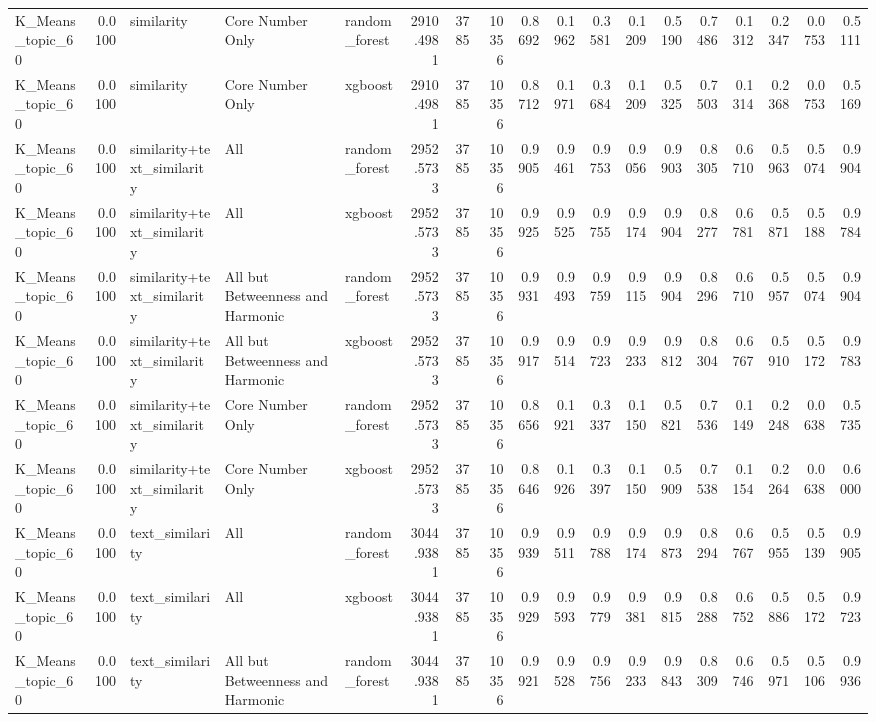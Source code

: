 \begin{tabular}{lrlllrrrrrrrrrrrrr}
K_Means_topic_60 & 0.0100 & similarity & Core Number Only & random_forest & 2910.4981 & 3785 & 10356 & 0.8692 & 0.1962 & 0.3581 & 0.1209 & 0.5190 & 0.7486 & 0.1312 & 0.2347 & 0.0753 & 0.5111 \\
K_Means_topic_60 & 0.0100 & similarity & Core Number Only & xgboost & 2910.4981 & 3785 & 10356 & 0.8712 & 0.1971 & 0.3684 & 0.1209 & 0.5325 & 0.7503 & 0.1314 & 0.2368 & 0.0753 & 0.5169 \\
K_Means_topic_60 & 0.0100 & similarity+text_similarity & All & random_forest & 2952.5733 & 3785 & 10356 & 0.9905 & 0.9461 & 0.9753 & 0.9056 & 0.9903 & 0.8305 & 0.6710 & 0.5963 & 0.5074 & 0.9904 \\
K_Means_topic_60 & 0.0100 & similarity+text_similarity & All & xgboost & 2952.5733 & 3785 & 10356 & 0.9925 & 0.9525 & 0.9755 & 0.9174 & 0.9904 & 0.8277 & 0.6781 & 0.5871 & 0.5188 & 0.9784 \\
K_Means_topic_60 & 0.0100 & similarity+text_similarity & All but Betweenness and Harmonic & random_forest & 2952.5733 & 3785 & 10356 & 0.9931 & 0.9493 & 0.9759 & 0.9115 & 0.9904 & 0.8296 & 0.6710 & 0.5957 & 0.5074 & 0.9904 \\
K_Means_topic_60 & 0.0100 & similarity+text_similarity & All but Betweenness and Harmonic & xgboost & 2952.5733 & 3785 & 10356 & 0.9917 & 0.9514 & 0.9723 & 0.9233 & 0.9812 & 0.8304 & 0.6767 & 0.5910 & 0.5172 & 0.9783 \\
K_Means_topic_60 & 0.0100 & similarity+text_similarity & Core Number Only & random_forest & 2952.5733 & 3785 & 10356 & 0.8656 & 0.1921 & 0.3337 & 0.1150 & 0.5821 & 0.7536 & 0.1149 & 0.2248 & 0.0638 & 0.5735 \\
K_Means_topic_60 & 0.0100 & similarity+text_similarity & Core Number Only & xgboost & 2952.5733 & 3785 & 10356 & 0.8646 & 0.1926 & 0.3397 & 0.1150 & 0.5909 & 0.7538 & 0.1154 & 0.2264 & 0.0638 & 0.6000 \\
K_Means_topic_60 & 0.0100 & text_similarity & All & random_forest & 3044.9381 & 3785 & 10356 & 0.9939 & 0.9511 & 0.9788 & 0.9174 & 0.9873 & 0.8294 & 0.6767 & 0.5955 & 0.5139 & 0.9905 \\
K_Means_topic_60 & 0.0100 & text_similarity & All & xgboost & 3044.9381 & 3785 & 10356 & 0.9929 & 0.9593 & 0.9779 & 0.9381 & 0.9815 & 0.8288 & 0.6752 & 0.5886 & 0.5172 & 0.9723 \\
K_Means_topic_60 & 0.0100 & text_similarity & All but Betweenness and Harmonic & random_forest & 3044.9381 & 3785 & 10356 & 0.9921 & 0.9528 & 0.9756 & 0.9233 & 0.9843 & 0.8309 & 0.6746 & 0.5971 & 0.5106 & 0.9936 \\

\end{tabular}
